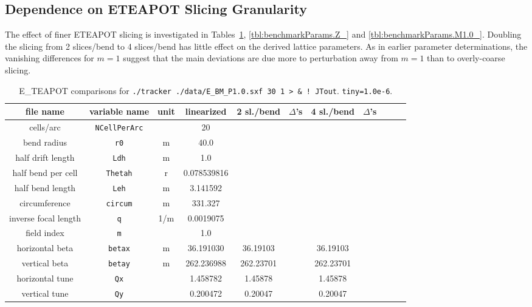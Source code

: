 \documentclass[12pt]{article}
\begin{document}
\subsection{Dependence on ETEAPOT Slicing Granularity}
The effect of finer ETEAPOT slicing is investigated in Tables~\ref{tbl:benchmarkParams.P1.0_},
\ref{tbl:benchmarkParams.Z_} and \ref{tbl:benchmarkParams.M1.0_}.  Doubling the slicing 
from 2 slices/bend to 4 slices/bend has little effect on the derived lattice parameters.
As in earlier parameter determinations, the vanishing differences for $m=1$ suggest that 
the main deviations are due more to perturbation away from $m=1$ than to overly-coarse slicing.
%
\begin{table}[h]
\caption{\label{tbl:benchmarkParams.P1.0_}E\_TEAPOT comparisons for
{\tt ./tracker ./data/E\_BM\_P1.0.sxf 30 1 > \& ! JTout}.  {\tt tiny=1.0e-6}.
} 
\medskip
\centering
\begin{tabular}{|c|c|c|c|c|c|c|c|c|c|c|}           \hline
file name         & variable name     & unit  &   linearized  & 2 sl./bend & $\Delta$'s & 4 sl./bend & $\Delta$'s  \\ \hline
cells/arc         & {\tt NCellPerArc} &       &        20     &  & & &        \\
bend radius       &  {\tt r0}         &  m    &       40.0    &  & & &        \\
half drift length &  {\tt Ldh}        &  m    &        1.0    &  & & &        \\
half bend per cell & {\tt Thetah}     &  r    &  0.078539816  &  &  & &       \\
half bend length  & {\tt Leh}         &  m    &   3.141592    &  &  & &       \\
circumference     & {\tt circum}      &  m    &    331.327    &  &  & &       \\ 
inverse focal length &  {\tt q}       & 1/m   &     0.0019075 &  & & &        \\
field index       &  {\tt m}          &       &         1.0   &  & & &         \\ \hline 
horizontal beta  & {\tt betax}       &  m     &   36.191030   &   36.19103 & & 36.19103 &        \\
vertical beta     & {\tt betay}       &  m    &  262.236988   &  262.23701 & & 262.23701 &        \\
horizontal tune  &  {\tt Qx}         &        &    1.458782   &    1.45878 & & 1.45878 &        \\ 
vertical tune     &  {\tt Qy}         &       &    0.200472   &    0.20047 & & 0.20047 &        \\ \hline
\end{tabular}
\end{table}
%
\end{document}
